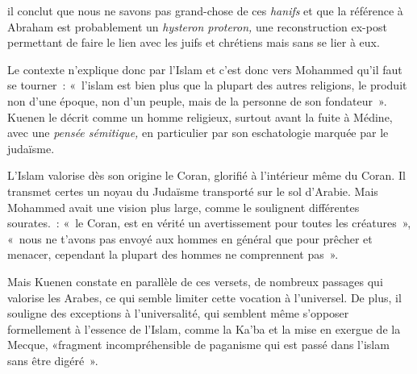il conclut que nous ne savons pas grand-chose de ces \emph{hanifs} et
que la référence à Abraham est probablement un \emph{hysteron proteron,}
une reconstruction ex-post permettant de faire le lien avec les juifs et
chrétiens mais sans se lier à eux.
 
Le contexte n'explique donc par l'Islam et c'est donc vers Mohammed
qu'il faut se tourner~: «~l'islam est bien plus que la plupart des
autres religions, le produit non d'une époque, non d'un peuple, mais de
la personne de son fondateur~». Kuenen le décrit
comme un homme religieux, surtout avant la fuite à Médine, avec une
\emph{pensée sémitique,} en particulier par son eschatologie marquée par
le judaïsme.

L'Islam valorise dès son origine le Coran, glorifié à l'intérieur même
du Coran. Il transmet certes un noyau du Judaïsme transporté sur le sol
d'Arabie. Mais Mohammed avait une vision plus large, comme le soulignent
différentes sourates.~: «~le Coran, est en vérité un avertissement pour
toutes les créatures~», «~nous ne t'avons pas
envoyé aux hommes en général que pour prêcher et menacer, cependant la
plupart des hommes ne comprennent pas~».~

Mais Kuenen constate en parallèle de ces versets, de nombreux passages
qui valorise les Arabes, ce qui semble limiter cette vocation à
l'universel. De plus, il souligne
des exceptions à l'universalité, qui semblent même s'opposer
formellement à l'essence de l'Islam, comme la Ka'ba et la mise en
exergue de la Mecque, «fragment incompréhensible de paganisme qui est
passé dans l'islam sans être digéré~».

